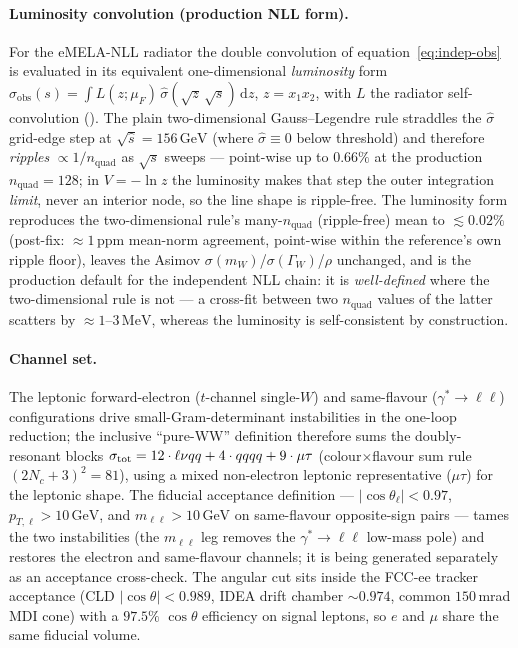 \documentclass[11pt,a4paper]{article}
\newcommand{\code}[1]{\texttt{\detokenize{#1}}}
\newcommand{\mW}{m_W}
\newcommand{\GammaW}{\Gamma_W}
\newcommand{\GeV}{\ensuremath{\,\mathrm{GeV}}}
\newcommand{\MeV}{\ensuremath{\,\mathrm{MeV}}}
\begin{document}
\paragraph{Luminosity convolution (production NLL form).} For the eMELA-NLL
radiator the double convolution of equation~\eqref{eq:indep-obs} is evaluated in
its equivalent one-dimensional \emph{luminosity} form
$\sigma_\text{obs}(s)=\int L(z;\mu_F)\,\hat\sigma(\sqrt z\,\sqrt s)\,\mathrm dz$,
$z=x_1x_2$, with $L$ the radiator self-convolution
(\code{framework/process/ww/indep/isr_lumi.py}). The plain two-dimensional
Gauss--Legendre rule straddles the $\hat\sigma$ grid-edge step at
$\sqrt{\hat s}=156\GeV$ (where $\hat\sigma\equiv0$ below threshold) and therefore
\emph{ripples} $\propto 1/n_\text{quad}$ as $\sqrt s$ sweeps --- point-wise up to
$0.66\%$ at the production $n_\text{quad}=128$; in $V=-\ln z$ the luminosity makes
that step the outer integration \emph{limit}, never an interior node, so the line
shape is ripple-free. The luminosity form reproduces the two-dimensional rule's
many-$n_\text{quad}$ (ripple-free) mean to $\lesssim0.02\%$ (post-fix:
${\approx}1$\,ppm mean-norm agreement, point-wise within the reference's own
ripple floor), leaves the Asimov $\sigma(\mW)$/$\sigma(\GammaW)$/$\rho$
unchanged, and is the production default for the independent NLL chain: it is
\emph{well-defined} where the two-dimensional rule is not --- a cross-fit
between two $n_\text{quad}$ values of the latter scatters by
${\approx}1$--$3\MeV$, whereas the luminosity is self-consistent by
construction.

\paragraph{Channel set.} The leptonic forward-electron ($t$-channel single-$W$)
and same-flavour ($\gamma^\ast\!\to\ell\ell$) configurations drive
small-Gram-determinant instabilities in the one-loop reduction; the inclusive
``pure-WW'' definition therefore sums the doubly-resonant blocks
$\sigma_{\rm tot}=12\cdot\ell\nu qq + 4\cdot qqqq + 9\cdot\mu\tau$
(colour$\times$flavour sum rule $(2N_c+3)^2=81$), using a mixed non-electron
leptonic representative ($\mu\tau$) for the leptonic shape. The fiducial
acceptance definition --- $|\cos\theta_\ell|<0.97$, $p_{T,\ell}>10\GeV$, and
$m_{\ell\ell}>10\GeV$ on same-flavour opposite-sign pairs --- tames the two
instabilities (the $m_{\ell\ell}$ leg removes the $\gamma^\ast\!\to\ell\ell$
low-mass pole) and restores the electron and same-flavour channels; it is being
generated separately as an acceptance cross-check. The angular cut sits inside
the FCC-ee tracker acceptance (CLD $|\cos\theta|<0.989$, IDEA drift chamber
$\sim\!0.974$, common $150\,$mrad MDI cone) with a $97.5\%$ $\cos\theta$
efficiency on signal leptons, so $e$ and $\mu$ share the same fiducial volume.
\end{document}
